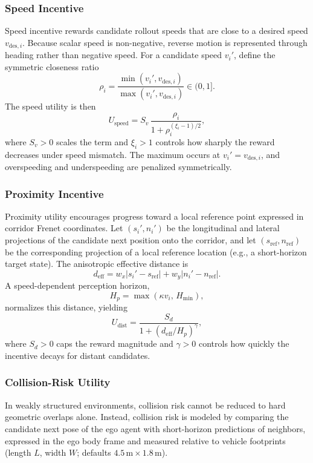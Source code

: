 \documentclass[conference]{IEEEtran}
\begin{document}
\subsubsection{Speed Incentive}
Speed incentive rewards candidate rollout speeds that are close to a desired speed $v_{\mathrm{des},i}$. Because scalar speed is non-negative, reverse motion is represented through heading rather than negative speed. For a candidate speed $v_{i}'$, define the symmetric closeness ratio
\begin{equation}
\rho_{i}
=
\frac{\min(v_{i}',v_{\mathrm{des},i})}{\max(v_{i}',v_{\mathrm{des},i})}\in(0,1].
\end{equation}
The speed utility is then
\begin{equation}
U_{\mathrm{speed}}
=
S_{v}\,
\frac{\rho_{i}}{1+\rho_{i}^{(\xi_{i}-1)/2}},
\end{equation}
where $S_{v}>0$ scales the term and $\xi_{i}>1$ controls how sharply the reward decreases under speed mismatch. The maximum occurs at $v_{i}'=v_{\mathrm{des},i}$, and overspeeding and underspeeding are penalized symmetrically.

\subsubsection{Proximity Incentive}
Proximity utility encourages progress toward a local reference point expressed in corridor Frenet coordinates. Let $(s_{i}',n_{i}')$ be the longitudinal and lateral projections of the candidate next position onto the corridor, and let $(s_{\mathrm{ref}},n_{\mathrm{ref}})$ be the corresponding projection of a local reference location (e.g., a short-horizon target state). The anisotropic effective distance is
\begin{equation}
d_{\mathrm{eff}}
=
w_{x}|s_{i}'-s_{\mathrm{ref}}|
+
w_{y}|n_{i}'-n_{\mathrm{ref}}|.
\end{equation}
A speed-dependent perception horizon,
\begin{equation}
H_{p}
=
\max\!\left(\kappa v_{i},\, H_{\min}\right),
\end{equation}
normalizes this distance, yielding
\begin{equation}
U_{\mathrm{dist}}
=
\frac{S_{d}}{1+(d_{\mathrm{eff}}/H_{p})^{\gamma}},
\end{equation}
where $S_{d}>0$ caps the reward magnitude and $\gamma>0$ controls how quickly the incentive decays for distant candidates.
\subsubsection{Collision-Risk Utility}
In weakly structured environments, collision risk cannot be reduced to hard geometric overlaps alone. Instead, collision risk is modeled by comparing the candidate next pose of the ego agent with short-horizon predictions of neighbors, expressed in the ego body frame and measured relative to vehicle footprints (length $L$, width $W$; defaults $4.5\,\mathrm{m}\times 1.8\,\mathrm{m}$).
\end{document}
